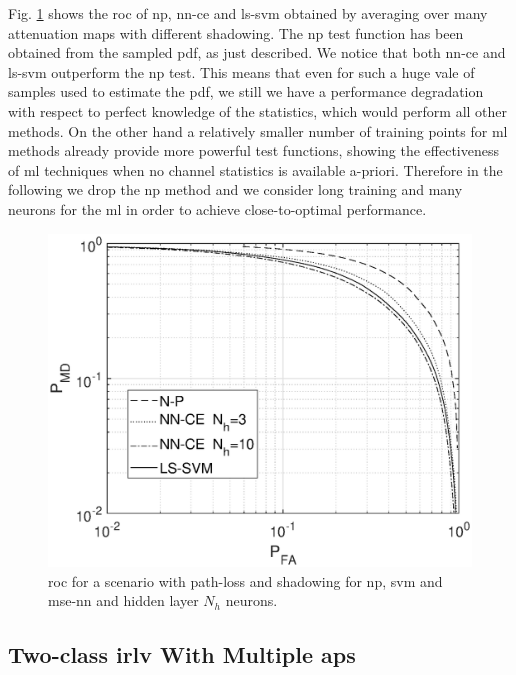 \documentclass[draftcls,onecolumn,12pt]{IEEEtran}
\begin{document}
Fig. \ref{fig:trueMap} shows the \ac{roc}  of \ac{np}, \ac{nn}-\ac{ce} and \ac{ls}-\ac{svm} obtained by averaging over many attenuation maps with different shadowing. The \ac{np} test function has been obtained from the sampled \ac{pdf}, as just described. We notice that both \ac{nn}-\ac{ce} and \ac{ls}-\ac{svm} outperform the \ac{np} test. This means that even for such a huge vale of samples used to estimate the \ac{pdf}, we still we have a performance degradation with respect to perfect knowledge of the statistics, which would perform all other methods. On the other hand a relatively smaller number of training points for \ac{ml} methods already provide more powerful test functions, showing the effectiveness of \ac{ml} techniques when no channel statistics is available a-priori. Therefore in the following we drop the \ac{np} method and we consider long training and many neurons for the \ac{ml} in order to achieve close-to-optimal performance.
 
\begin{figure}[t]
    \centering
    \includegraphics[width=0.6\columnwidth]{res_NP_approx_SVM.eps}
    \caption{\ac{roc} for a scenario with path-loss and shadowing for \ac{np}, \ac{svm} and \ac{mse}-\ac{nn} and hidden layer $N_h$ neurons.}
    \label{fig:trueMap}
\end{figure}


\subsection{Two-class \ac{irlv} With Multiple \acp{ap}}
\label{sec:res_fading}
\end{document}

